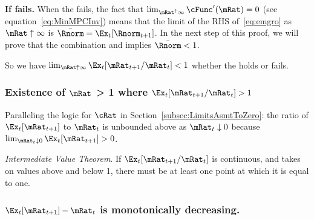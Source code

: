 \documentclass[\econtexRoot/BufferStockTheory]{subfiles}
\begin{document}
\textbf{If {\RIC} fails.}  When the {\RIC} fails, the fact that $\lim_{\mRat^{\uparrow} \infty} \cFunc^{\prime}(\mRat) = 0$ (see equation~\eqref{eq:MinMPCInv}) means that the limit of the RHS of~\eqref{eq:emgro} as $\mRat \uparrow \infty$ is $\bar{\Rnorm}=\Ex_{t}[\Rnorm_{t+1}]$.  In the next step of this proof, we will prove that the combination {\GICNrm} and \cncl{\RIC} implies $\bar{\Rnorm} < 1$.

So we have $\lim_{\mRat \uparrow \infty} \Ex_{t}[\mRat_{t+1}/\mRat_{t}] < 1$ whether the {\RIC} holds or fails.

\medskip

\subsubsection{Existence of \texorpdfstring{$\mRat$}{m} > 1 where \texorpdfstring{$\Ex_t [{\mRat}_{t+1}/\mRat_t] > 1$}{E[m{t+1}/m{t}] > 1}}
Paralleling the logic for $\cRat$ in Section~\ref{subsec:LimitsAsmtToZero}: the ratio of $\Ex_{t}[\mRat_{t+1}]$ to $\mRat_{t}$ is unbounded above as $\mRat_{t} \downarrow 0$ because $\lim_{\mRat_{t}\downarrow 0} \Ex_{t}[\mRat_{t+1}] > 0$.

\medskip\medskip

\noindent \textit{Intermediate Value Theorem}.  If $\Ex_t [{\mRat}_{t+1}/\mRat_t]$ is continuous, and takes on values above and below 1, there must be at least one point at which it is equal to one.

\subsubsection{\texorpdfstring{$\Ex_t [{\mRat}_{t+1}] -\mRat_t$}{Delta m} is monotonically decreasing.}
\end{document}
